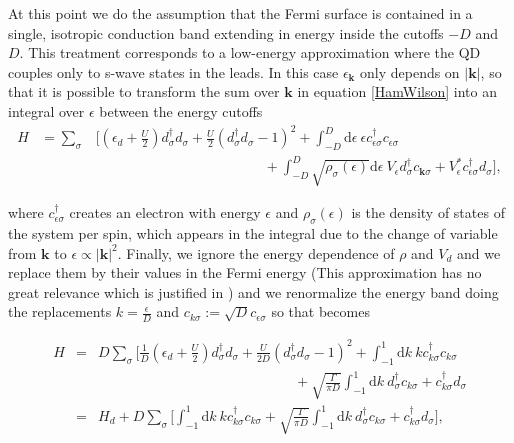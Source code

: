 At this point we do the assumption that the Fermi surface is contained
in a single, isotropic conduction band extending in energy inside
the cutoffs $-D$ and $D$. This treatment corresponds to a low-energy
approximation where the QD couples only to s-wave states in the leads\citep{krishna-murthy_renormalization-group_1980}.
In this case $\epsilon_{\mathbf{k}}$ only depends on $\left|\mathbf{k}\right|$,
so that it is possible to transform the sum over $\mathbf{k}$ in
equation \ref{HamWilson} into an integral over $\epsilon$ between
the energy cutoffs
\begin{eqnarray}
H & =\sum_{\sigma} & \Biggl[\left(\epsilon_{d}+\frac{U}{2}\right)d_{\sigma}^{\dagger}d_{\sigma}+\frac{U}{2}(d_{\sigma}^{\dagger}d_{\sigma}-1)^{2}+\int_{-D}^{D}\mbox{d}\epsilon\ \epsilon c_{\epsilon\sigma}^{\dagger}c_{\epsilon\sigma}\nonumber \\
 &  & \qquad\qquad\qquad\qquad\qquad\qquad+\int_{-D}^{D}\sqrt{\rho_{\sigma}(\epsilon)}\mbox{d}\epsilon\ V_{\epsilon}d_{\sigma}^{\dagger}c_{\mathbf{k}\sigma}+V_{\epsilon}^{*}c_{\epsilon\sigma}^{\dagger}d_{\sigma}\Biggr],\label{eq:hamEnergy}
\end{eqnarray}


where $c_{\epsilon\sigma}^{\dagger}$ creates an electron with energy
$\epsilon$ and $\rho_{\sigma}(\epsilon)$ is the density of states
of the system per spin, which appears in the integral due to the change
of variable from $\mathbf{k}$ to $\epsilon\propto\left|\mathbf{k}\right|^{2}.$
Finally, we ignore the energy dependence of $\rho$ and $V_{d}$ and
we replace them by their values in the Fermi energy (This approximation
has no great relevance which is justified in \citep{krishna-murthy_renormalization-group_1980})
and we renormalize the energy band doing the replacements $k=\frac{\epsilon}{D}$
and $c_{k\sigma}:=\sqrt{D}c_{\epsilon\sigma}$ so that 
becomes

\begin{eqnarray}
H & = & D\sum_{\sigma}\Biggl[\frac{1}{D}\left(\epsilon_{d}+\frac{U}{2}\right)d_{\sigma}^{\dagger}d_{\sigma}+\frac{U}{2D}(d_{\sigma}^{\dagger}d_{\sigma}-1)^{2}+\int_{-1}^{1}\mbox{d}k\ kc_{k\sigma}^{\dagger}c_{k\sigma}\nonumber \\
 &  & \qquad\qquad\qquad\qquad\qquad\qquad\qquad+\sqrt{\frac{\Gamma}{\pi D}}\int_{-1}^{1}\mbox{d}k\ d_{\sigma}^{\dagger}c_{k\sigma}+c_{k\sigma}^{\dagger}d_{\sigma}\label{eq:Norm-HamEnergy}\\
 & = & H_{d}+D\sum_{\sigma}\Biggl[\int_{-1}^{1}\mbox{d}k\ kc_{k\sigma}^{\dagger}c_{k\sigma}+\sqrt{\frac{\Gamma}{\pi D}}\int_{-1}^{1}\mbox{d}k\ d_{\sigma}^{\dagger}c_{k\sigma}+c_{k\sigma}^{\dagger}d_{\sigma}\Biggr],
\end{eqnarray}


